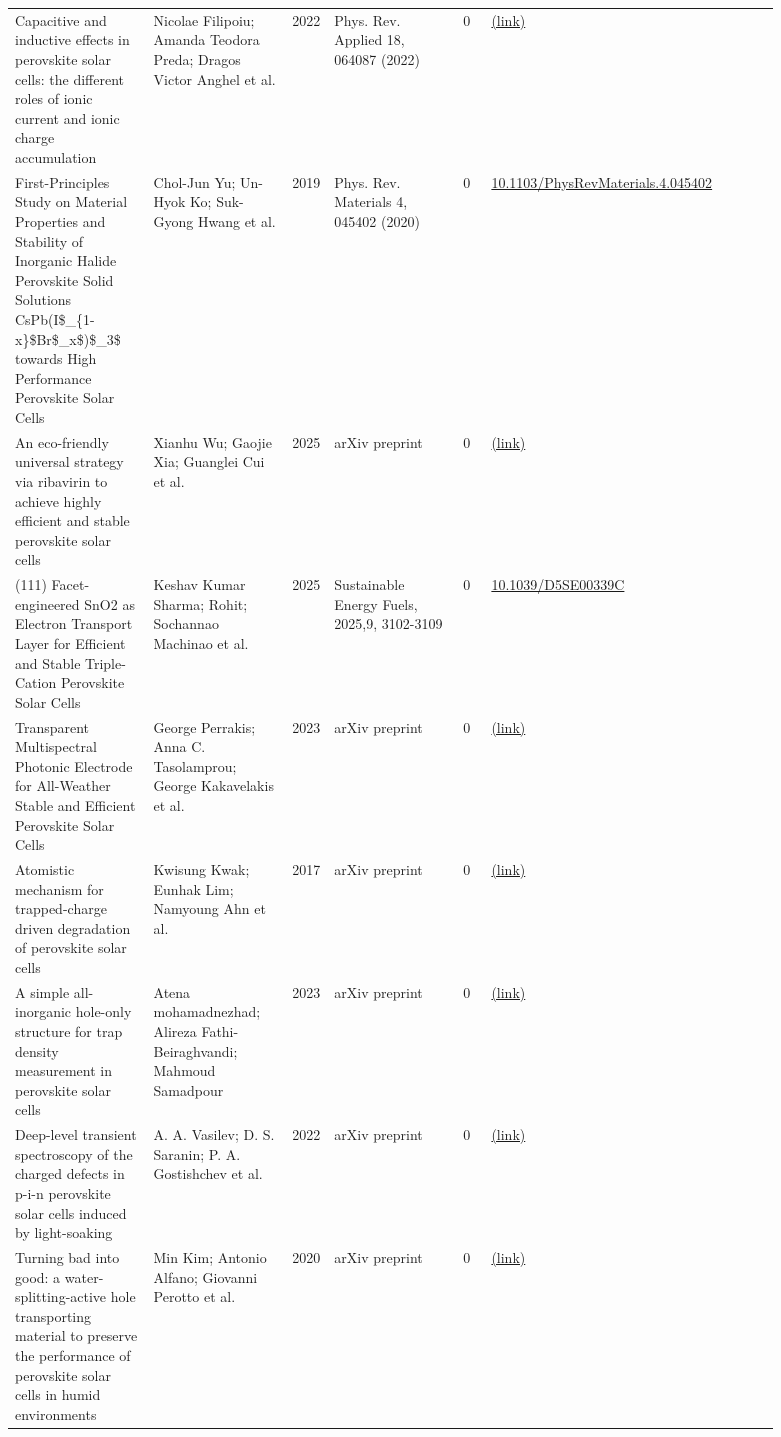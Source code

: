 \documentclass[10pt,a4paper]{article}
\begin{document}
{\begin{longtable}{p{0.197\linewidth}p{0.197\linewidth}p{0.043\linewidth}p{0.197\linewidth}p{0.043\linewidth}p{0.117\linewidth}p{0.098\linewidth}}
Capacitive and inductive effects in perovskite solar cells: the different roles of ionic current and ionic charge accumulation & Nicolae Filipoiu; Amanda Teodora Preda; Dragos Victor Anghel et al. & 2022 & Phys. Rev. Applied 18, 064087 (2022) & 0 & \href{http://arxiv.org/abs/2208.10199v2}{(link)} &  \\
First-Principles Study on Material Properties and Stability of Inorganic Halide Perovskite Solid Solutions CsPb(I\$\_\{1-x\}\$Br\$\_x\$)\$\_3\$ towards High Performance Perovskite Solar Cells & Chol-Jun Yu; Un-Hyok Ko; Suk-Gyong Hwang et al. & 2019 & Phys. Rev. Materials 4, 045402 (2020) & 0 & \href{https://doi.org/10.1103/PhysRevMaterials.4.045402}{10.1103/PhysRevMaterials.4.045402} &  \\
An eco-friendly universal strategy via ribavirin to achieve highly efficient and stable perovskite solar cells & Xianhu Wu; Gaojie Xia; Guanglei Cui et al. & 2025 & arXiv preprint & 0 & \href{http://arxiv.org/abs/2507.10557v1}{(link)} &  \\
(111) Facet-engineered SnO2 as Electron Transport Layer for Efficient and Stable Triple-Cation Perovskite Solar Cells & Keshav Kumar Sharma;  Rohit; Sochannao Machinao et al. & 2025 & Sustainable Energy Fuels, 2025,9, 3102-3109 & 0 & \href{https://doi.org/10.1039/D5SE00339C}{10.1039/D5SE00339C} &  \\
Transparent Multispectral Photonic Electrode for All-Weather Stable and Efficient Perovskite Solar Cells & George Perrakis; Anna C. Tasolamprou; George Kakavelakis et al. & 2023 & arXiv preprint & 0 & \href{http://arxiv.org/abs/2308.03386v1}{(link)} &  \\
Atomistic mechanism for trapped-charge driven degradation of perovskite solar cells & Kwisung Kwak; Eunhak Lim; Namyoung Ahn et al. & 2017 & arXiv preprint & 0 & \href{http://arxiv.org/abs/1709.04130v1}{(link)} &  \\
A simple all-inorganic hole-only structure for trap density measurement in perovskite solar cells & Atena mohamadnezhad; Alireza Fathi-Beiraghvandi; Mahmoud Samadpour & 2023 & arXiv preprint & 0 & \href{http://arxiv.org/abs/2306.07136v2}{(link)} &  \\
Deep-level transient spectroscopy of the charged defects in p-i-n perovskite solar cells induced by light-soaking & A. A. Vasilev; D. S. Saranin; P. A. Gostishchev et al. & 2022 & arXiv preprint & 0 & \href{http://arxiv.org/abs/2210.11176v1}{(link)} &  \\
Turning bad into good: a water-splitting-active hole transporting material to preserve the performance of perovskite solar cells in humid environments & Min Kim; Antonio Alfano; Giovanni Perotto et al. & 2020 & arXiv preprint & 0 & \href{http://arxiv.org/abs/2005.09703v1}{(link)} &  \\

\end{longtable}}
\end{document}
